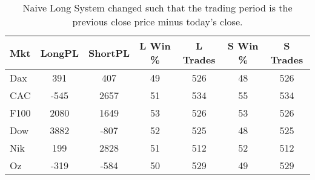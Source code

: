\begin{table}[ht]
\centering
\caption[Naive Long System - Close to Close]{Naive Long System changed such that the trading period is the previous close price minus today's close.} 
\label{tab:mac_ob_results}
\begin{tabular}{lcccccc}
  \toprule Mkt & LongPL & ShortPL & L Win \% & L Trades & S Win \% & S Trades \\ 
  \midrule Dax & 391 & 407 & 49 & 526 & 48 & 526 \\ 
  CAC & -545 & 2657 & 51 & 534 & 55 & 534 \\ 
  F100 & 2080 & 1649 & 53 & 526 & 53 & 526 \\ 
  Dow & 3882 & -807 & 52 & 525 & 48 & 525 \\ 
  Nik & 199 & 2828 & 51 & 512 & 52 & 512 \\ 
  Oz & -319 & -584 & 50 & 529 & 49 & 529 \\ 
   \bottomrule \end{tabular}
\end{table}
